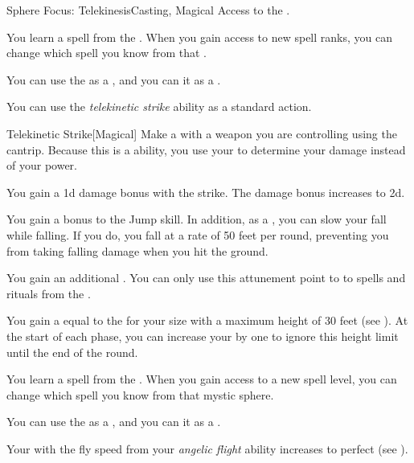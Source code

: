     \begin{feat}{Sphere Focus: Telekinesis}{Casting, Magical}
        \featpre Access to the  .

         You learn a spell from the  .
        When you gain access to new spell ranks, you can change which spell you know from that .

         You can use the   as a , and you can  it as a .

         You can use the \textit{telekinetic strike} ability as a standard action.
        \begin{freeability}{Telekinetic Strike}[Magical]
            Make a  with a weapon you are controlling using the  cantrip.
            Because this is a  ability, you use your   to determine your damage instead of your  power.

            \rankline
             You gain a \plus1d damage bonus with the strike.
             The damage bonus increases to \plus2d.
        \end{freeability}

         You gain a  bonus to the Jump skill.
        In addition, as a , you can slow your fall while falling.
        If you do, you fall at a rate of 50 feet per round, preventing you from taking falling damage when you hit the ground.

         You gain an additional .
        You can only use this attunement point to  to spells and rituals from the  .

         You gain a  equal to the  for your size with a maximum height of 30 feet (see ).
        At the start of each phase, you can increase your  by one to ignore this height limit until the end of the round.

         You learn a spell from the  .
        When you gain access to a new spell level, you can change which spell you know from that mystic sphere.

         You can use the   as a , and you can  it as a .

         Your  with the fly speed from your \textit{angelic flight} ability increases to perfect (see ).
    \end{feat}

